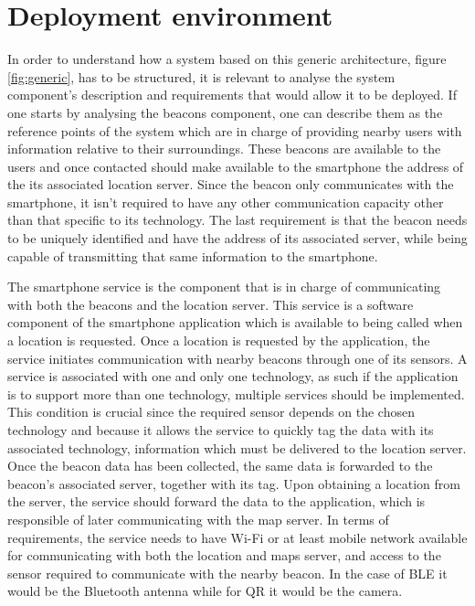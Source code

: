\section{Deployment environment} 
\label{sec:deployment} 
 
 
In order to understand how a system based on this generic architecture, figure \ref{fig:generic}, has to be structured, it is relevant to analyse the system component's description and requirements that would allow it to be deployed. If one starts by analysing the beacons component, one can describe them as the reference points of the system which are in charge of providing nearby users with information relative to their surroundings. These beacons are available to the users and once contacted should make available to the smartphone the address of the its associated location server. Since the beacon only communicates with the smartphone, it isn't required to have any other communication capacity other than that specific to its technology. The last requirement is that the beacon needs to be uniquely identified and have the address of its associated server, while being capable of transmitting that same information to the smartphone. 
 
 
The smartphone service is the component that is in charge of communicating with both the beacons and the location server. This service is a software component of the smartphone application which is available to being called when a location is requested. Once a location is requested by the application, the service initiates communication with nearby beacons through one of its sensors. A service is associated with one and only one technology, as such if the application is to support more than one technology, multiple services should be implemented. This condition is crucial since the required sensor depends on the chosen technology and because it allows the service to quickly tag the data with its associated technology, information which must be delivered to the location server. Once the beacon data has been collected, the same data is forwarded to the beacon's associated server, together with its tag. Upon obtaining a location from the server, the service should forward the data to the application, which is responsible of later communicating with the map server. In terms of requirements, the service needs to have Wi-Fi or at least mobile network available for communicating with both the location and maps server, and access to the sensor required to communicate with the nearby beacon. In the case of BLE it would be the Bluetooth antenna while for QR it would be the camera. 
 
